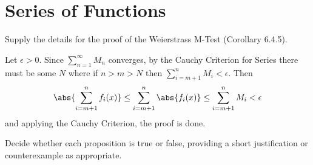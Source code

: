 \section{Series of Functions}

\begin{exercise}
  Supply the details for the proof of the Weierstrass M-Test (Corollary 6.4.5).

\end{exercise}
\begin{solution}
Let \(\epsilon > 0\). Since \(\sum^\infty_{n=1}M_n\) converges, by the Cauchy Criterion for Series there must be some \(N\) where if \(n>m > N\) then \(\sum^{n}_{i=m+1}M_i < \epsilon\).
Then
\[\abs{\sum^n_{i=m+1}f_i(x)} \leq \sum^n_{i=m+1}\abs{f_i(x)} \leq \sum^n_{i=m+1} M_i < \epsilon\]
and applying the Cauchy Criterion, the proof is done.
\end{solution}
\begin{exercise}
  Decide whether each proposition is true or false, providing a short justification or counterexample as appropriate.
\end{exercise}
